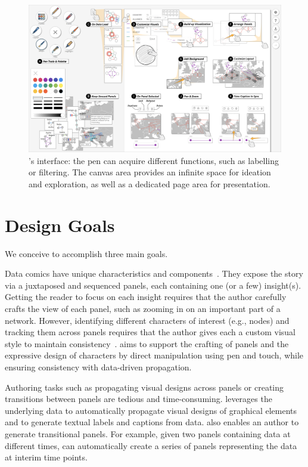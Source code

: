 
\begin{figure}[!tp]
    \centering
    \includegraphics[width=1.0\textwidth]{figures/interface-overview.png} 
    \caption{\toolname{}'s interface: the pen can acquire different functions, such as labelling or filtering. The canvas area provides an infinite space for ideation and exploration, as well as a dedicated page area for presentation.}
    \vspace{-0.2cm}
    \label{fig:interface}
\end{figure}

\section{Design Goals}
\label{sec:data_comics}


We conceive \toolname{} to accomplish three main goals.

Data comics have unique characteristics and components~\cite{bach2017emerging,bachdesign}. They expose the story via a juxtaposed and sequenced panels, each containing one (or a few) insight(s). Getting the reader to focus on each insight requires that the author carefully crafts the view of each panel, such as zooming in on an important part of a network. However, identifying different characters of interest (e.g., nodes) and tracking them across panels requires that the author gives each a custom visual style to maintain consistency~\cite{qu2018keeping}. \toolname{} aims to support the crafting of panels and the expressive design of characters by direct manipulation using pen and touch, while ensuring consistency with data-driven propagation.

Authoring tasks such as propagating visual designs across panels or creating transitions between panels are tedious and time-consuming. \toolname{} leverages the underlying data to automatically propagate visual designs of graphical elements and to generate textual labels and captions from data. \toolname{} also enables an author to generate transitional panels. For example, given two panels containing data at different times, \toolname{} can automatically create a series of panels representing the data at interim time points. 

